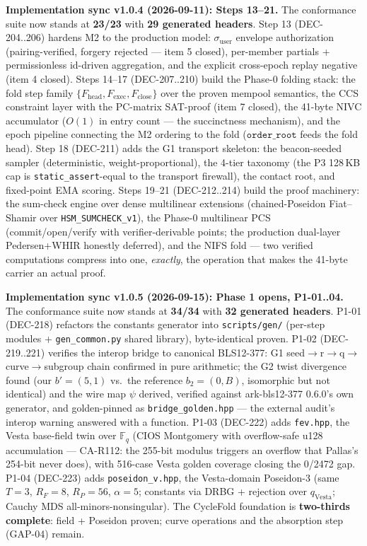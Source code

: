 \documentclass[11pt, a4paper]{article}
\begin{document}
\textbf{Implementation sync v1.0.4 (2026-09-11): Steps 13--21.} The conformance
suite now stands at \textbf{23/23} with \textbf{29 generated headers}. Step 13 (DEC-204..206)
hardens M2 to the production model: $\sigma_{\mathrm{user}}$ envelope authorization
(pairing-verified, forgery rejected --- item 5 closed), per-member partials + permissionless
id-driven aggregation, and the explicit cross-epoch replay negative (item 4 closed).
Steps 14--17 (DEC-207..210) build the Phase-0 folding stack: the fold step family
 $\{F_{\text{head}}, F_{\text{exec}}, F_{\text{close}}\}$ over the proven mempool semantics,
the CCS constraint layer with the PC-matrix SAT-proof (item 7 closed), the 41-byte NIVC
accumulator ($O(1)$ in entry count --- the succinctness mechanism), and the epoch pipeline
connecting the M2 ordering to the fold ($\texttt{order\_root}$ feeds the fold head).
Step 18 (DEC-211) adds the G1 transport skeleton: the beacon-seeded sampler (deterministic,
weight-proportional), the 4-tier taxonomy (the P3 128\,KB cap is
\texttt{static\_assert}-equal to the transport firewall), the contact root, and fixed-point
EMA scoring. Steps 19--21 (DEC-212..214) build the proof machinery: the sum-check engine over
dense multilinear extensions (chained-Poseidon Fiat--Shamir over \texttt{HSM\_SUMCHECK\_v1}),
the Phase-0 multilinear PCS (commit/open/verify with verifier-derivable points; the production
dual-layer Pedersen+WHIR honestly deferred), and the NIFS fold --- two verified computations
compress into one, \emph{exactly}, the operation that makes the 41-byte carrier an actual proof.

\textbf{Implementation sync v1.0.5 (2026-09-15): Phase 1 opens, P1-01..04.} The
conformance suite now stands at \textbf{34/34} with \textbf{32 generated headers}.
P1-01 (DEC-218) refactors the constants generator into \texttt{scripts/gen/}
(per-step modules + \texttt{gen\_common.py} shared library), byte-identical
proven. P1-02 (DEC-219..221) verifies the interop bridge to canonical
BLS12-377: G1 seed$\to$r$\to$q$\to$curve$\to$subgroup chain confirmed in pure
arithmetic; the G2 twist divergence found (our $b'=(5,1)$ vs.\ the reference
 $b_2=(0,B)$, isomorphic but not identical) and the wire map $\psi$ derived,
verified against ark-bls12-377 0.6.0's own generator, and golden-pinned as
\texttt{bridge\_golden.hpp} --- the external audit's interop warning answered
with a function. P1-03 (DEC-222) adds \texttt{fev.hpp}, the Vesta base-field
twin over $\mathbb{F}_q$ (CIOS Montgomery with overflow-safe u128 accumulation
--- CA-R112: the 255-bit modulus triggers an overflow that Pallas's 254-bit
never does), with 516-case Vesta golden coverage closing the 0/2472 gap.
P1-04 (DEC-223) adds \texttt{poseidon\_v.hpp}, the Vesta-domain Poseidon-3
(same $T{=}3$, $R_F{=}8$, $R_P{=}56$, $\alpha{=}5$; constants via DRBG +
rejection over $q_{\text{Vesta}}$; Cauchy MDS all-minors-nonsingular). The
CycleFold foundation is \textbf{two-thirds complete}: field + Poseidon proven;
curve operations and the absorption step (GAP-04) remain.
\end{document}
